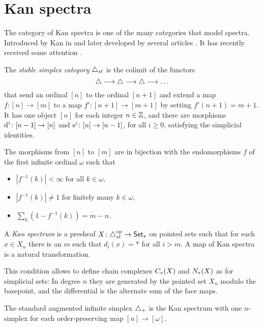 
\section{Kan spectra}\label{s:9Kanspectra}

The category of Kan spectra is one of the many categories that model spectra. Introduced by Kan in \cite{Kan1963} and later developed by several articles \cite{burghelea_kanspectraI1967, burghelea_kanspectraII_1968, burghelea_kanspectraIII1969,Brown1973}. It has recently received some attention \cite{Stephan2015, CKP2023}.

\begin{definition}
    The \emph{stable simplex category} $\triangle_{st}$ is the colimit of the functors
    \[
        \triangle\longrightarrow \triangle\longrightarrow \triangle\longrightarrow \ldots
    \]
    that send an ordinal $[n]$ to the ordinal $[n+1]$ and extend a map $f\colon [n]\to [m]$ to a map $f'\colon [n+1]\to [m+1]$ by setting $f'(n+1) = m+1$. It has one object $[n]$ for each integer $n\in \mathbb{Z}$, and there are morphisms $\operatorname{d}^i\colon [n-1]\to [n]$ and $\operatorname{s}^i\colon [n]\to [n-1]$, for all $i\geq 0$, satisfying the simplicial identities.
\end{definition}
The morphisms from $[n]$ to $[m]$ are in bijection with the endomorphisms $f$ of the first infinite ordinal $\omega$ such that 
\begin{itemize}
	\item $|f^{-1}(k)|<\infty$ for all $k\in \omega$,
	\item $|f^{-1}(k)|\neq 1$ for finitely many $k\in \omega$,
	\item $\sum_k (1-f^{-1}(k)) = m-n$.
\end{itemize}
\begin{definition}
    A \emph{Kan spectrum} is a presheaf $X\colon \triangle_{st}^{{\mathrm{op}}}\to \mathsf{Set}_*$ on pointed sets such that for each $x\in X_n$ there is an $m$ such that $d_i(x) = *$ for all $i>m$. A map of Kan spectra is a natural transformation.
\end{definition}

This condition allows to define chain complexes $C_{*}(X)$ and $N_{*}(X)$ as for simplicial sets: In degree $n$ they are generated by the pointed set $X_n$ modulo the basepoint, and the differential is the alternate sum of the face maps.

The standard augmented infinite simplex $\triangle_{+}$ is the Kan spectrum with one $n$-simplex for each order-preserving map $[n]\to [\omega]$. 

